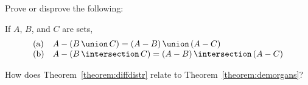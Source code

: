 Prove or disprove the following:

\begin{stmt}\label{theorem:diffdistr}
If $A$, $B$, and $C$ are sets,
\[\begin{array}{ll} 
\textrm{(a)} &  A - (\setunion{B}{C}) = \setunion{(A-B)}{(A-C)}
\\
\textrm{(b)} & A - (\setintersection{B}{C}) = \setintersection{(A-B)}{(A-C)}
\end{array}\]
\end{stmt}

\begin{exer}
How does Theorem~\ref{theorem:diffdistr} relate to Theorem~\ref{theorem:demorgans}?
\end{exer}

